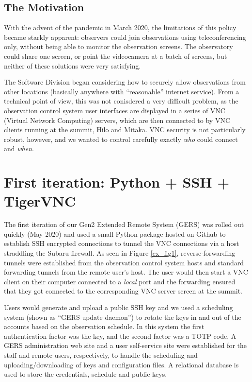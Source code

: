 \documentclass[11pt,twoside]{article}
\begin{document}
\subsection{The Motivation}
With the advent of the pandemic in March 2020, the limitations of this policy became
starkly apparent: observers could join observations using teleconferencing only, without
being able to monitor the observation screens.  The observatory could share one screen,
or point the videocamera at a batch of screens, but neither of these solutions were
very satisfying.

The Software Division began considering how to securely
allow observations from other locations (basically anywhere with ``reasonable''
internet service).
From a technical point of view, this was not conisdered a very difficult problem,
as the observation control system user interfaces are displayed in a series of VNC
(Virtual Network Computing) servers, which are then connected to by VNC clients
running at the summit, Hilo and Mitaka.  VNC security is not particularly
robust, however, and we wanted to control carefully exactly \emph{who} could connect
and \emph{when}.

\section{First iteration: Python + SSH + TigerVNC}
The first iteration of our Gen2 Extended Remote System (GERS) was rolled out quickly
(May 2020) and used a small Python package hosted on Github to establish SSH encrypted
connections to tunnel the VNC connections via a host straddling the Subaru
firewall.
As seen in Figure \ref{ex_fig1},
reverse-forwarding tunnels were established from the observation control system
hosts and standard forwarding tunnels from the remote user's host.
The user would then start a VNC client on their computer connected to a
\emph{local} port and the forwarding ensured that they got connected to the
corresponding VNC server screen at the summit.


Users would generate and upload a public SSH key and we used a scheduling system
(shown as ``GERS update daemon'') to rotate the keys in and out of the accounts based on the
observation schedule.
In this system the first authentication factor was the key, and the second factor was a TOTP
code.
A GERS administration web site and a user self-service site were established for the
staff and remote users, respectively, to handle the scheduling and uploading/downloading
of keys and configuration files.  A relational database is used to store the credentials,
schedule and public keys.
\end{document}
